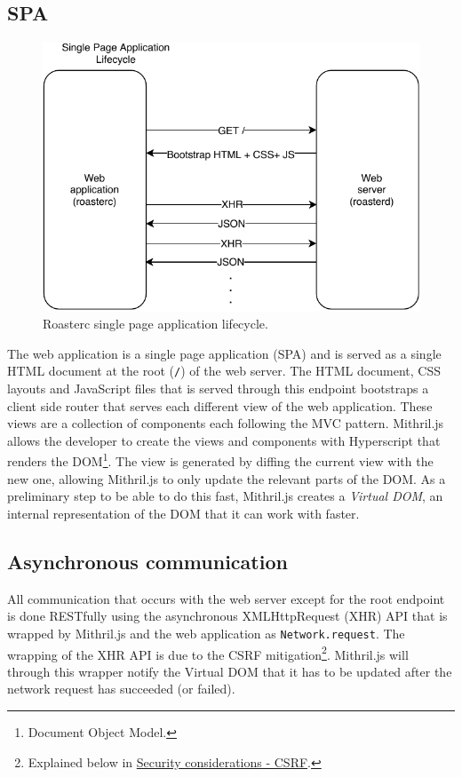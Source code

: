 \documentclass[12pt,a4paper]{report}
\begin{document}
\subsection{SPA}
\begin{figure}[H]
  \centering
  \includegraphics[width=16cm]{spa-lifecycle.pdf}
  \caption{Roasterc single page application lifecycle.}
  \label{fig:roasterc-lifecycle}
\end{figure}

The web application is a single page application (SPA) and is served as a single HTML document at the root (\texttt{/}) of the web server. The HTML document, CSS layouts and JavaScript files that is served through this endpoint bootstraps a client side router that serves each different view of the web application. These views are a collection of components each following the MVC pattern. Mithril.js allows the developer to create the views and components with Hyperscript that renders the DOM\footnote{Document Object Model.}. The view is generated by diffing the current view with the new one, allowing Mithril.js to only update the relevant parts of the DOM. As a preliminary step to be able to do this fast, Mithril.js creates a \textit{Virtual DOM}, an internal representation of the DOM that it can work with faster.

\subsection{Asynchronous communication}
All communication that occurs with the web server except for the root endpoint is done RESTfully using the asynchronous XMLHttpRequest (XHR) API that is wrapped by Mithril.js and the web application as \texttt{Network.request}. The wrapping of the XHR API is due to the CSRF mitigation\footnote{Explained below in \hyperref[subsec:csrf]{Security considerations - CSRF}.}. Mithril.js will through this wrapper notify the Virtual DOM that it has to be updated after the network request has succeeded (or failed).
\end{document}
